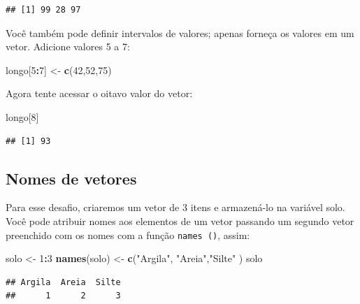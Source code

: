 \documentclass[
]{book}
\newenvironment{Shaded}{\begin{snugshade}}{\end{snugshade}}
\newcommand{\DecValTok}[1]{\textcolor[rgb]{0.00,0.00,0.81}{#1}}
\newcommand{\KeywordTok}[1]{\textcolor[rgb]{0.13,0.29,0.53}{\textbf{#1}}}
\newcommand{\NormalTok}[1]{#1}
\newcommand{\OperatorTok}[1]{\textcolor[rgb]{0.81,0.36,0.00}{\textbf{#1}}}
\newcommand{\StringTok}[1]{\textcolor[rgb]{0.31,0.60,0.02}{#1}}
\begin{document}
\begin{verbatim}
## [1] 99 28 97
\end{verbatim}

Você também pode definir intervalos de valores; apenas forneça os valores em um vetor. Adicione valores 5 a 7:

\begin{Shaded}
\begin{Highlighting}[]
\NormalTok{longo[}\DecValTok{5}\OperatorTok{:}\DecValTok{7}\NormalTok{] <-}\StringTok{ }\KeywordTok{c}\NormalTok{(}\DecValTok{42}\NormalTok{,}\DecValTok{52}\NormalTok{,}\DecValTok{75}\NormalTok{)}
\end{Highlighting}
\end{Shaded}

Agora tente acessar o oitavo valor do vetor:

\begin{Shaded}
\begin{Highlighting}[]
\NormalTok{longo[}\DecValTok{8}\NormalTok{]}
\end{Highlighting}
\end{Shaded}

\begin{verbatim}
## [1] 93
\end{verbatim}

\hypertarget{nomes-de-vetores}{%
\subsection{Nomes de vetores}\label{nomes-de-vetores}}

Para esse desafio, criaremos um vetor de 3 itens e armazená-lo na variável solo.
Você pode atribuir nomes aos elementos de um vetor passando um segundo vetor preenchido com os nomes com a função \texttt{names\ ()}, assim:

\begin{Shaded}
\begin{Highlighting}[]
\NormalTok{solo <-}\StringTok{ }\DecValTok{1}\OperatorTok{:}\DecValTok{3}
\KeywordTok{names}\NormalTok{(solo) <-}\StringTok{ }\KeywordTok{c}\NormalTok{(}\StringTok{"Argila"}\NormalTok{, }\StringTok{"Areia"}\NormalTok{,}\StringTok{"Silte"}\NormalTok{ )}
\NormalTok{solo}
\end{Highlighting}
\end{Shaded}

\begin{verbatim}
## Argila  Areia  Silte 
##      1      2      3
\end{verbatim}
\end{document}
